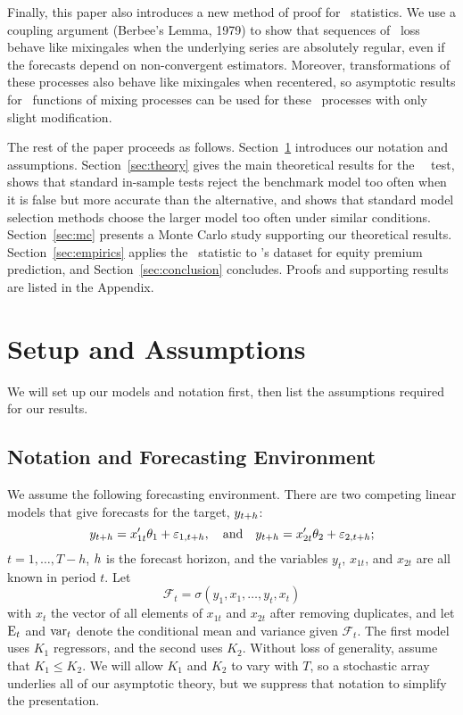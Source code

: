 \documentclass[11pt]{article}
\newcommand{\e}{\varepsilon}
\newcommand{\citepos}[1]{\citeauthor{#1}'s \citeyearpar{#1}}
\begin{document}
Finally, this paper also introduces a new method of proof for \oos\
statistics.  We use a coupling argument (Berbee's Lemma, 1979) to show
that sequences of \oos\ loss behave like mixingales when the
underlying series are absolutely regular, even if the forecasts depend
on non-convergent estimators.  Moreover, transformations of these
processes also behave like mixingales when recentered, so asymptotic
results for \ned\ functions of mixing processes can be used for these
\oos\ processes with only slight modification.

The rest of the paper proceeds as follows.
Section~\ref{sec:assumptions} introduces our notation and assumptions.
Section~\ref{sec:theory} gives the main theoretical results for the
\dmw\ \oos\ test, shows that standard in-sample tests reject the
benchmark model too often when it is false but more accurate than the
alternative, and shows that standard model selection methods choose the
larger model too often under similar conditions. Section~\ref{sec:mc}
presents a Monte Carlo study supporting our theoretical results.
Section~\ref{sec:empirics} applies the \oos\ statistic to
\citepos{GoW:08} dataset for equity premium prediction, and
Section~\ref{sec:conclusion} concludes.  Proofs and supporting results
are listed in the Appendix.

\section{Setup and Assumptions}\label{sec:assumptions}
We will set up our models and notation first, then list the assumptions
required for our results.  

\subsection{Notation and Forecasting Environment}
We assume the following forecasting environment. There are two
competing linear models that give forecasts for the target,
$y_{t+h}$:
\[
y_{t+\h} = x_{1t}'\theta_1 + \e_{1,t+h}, \quad\text{and}\quad
y_{t+\h} = x_{2t}'\theta_2 + \e_{2,t+h};
\]
$t = 1,\dots,T-h$, $h$ is the forecast horizon, and the
variables $y_t$, $x_{1t}$, and $x_{2t}$ are all known in period $t$.
Let
\begin{equation*}
  \mathcal{F}_t = \sigma(y_1, x_1, \dots, y_t, x_t)
\end{equation*}
with $x_t$ the vector of all elements of $x_{1t}$ and $x_{2t}$ after
removing duplicates, and let $\operatorname{E}_t$ and $\operatorname{var}_t$ denote the
conditional mean and variance given $\mathcal{F}_t$.  The first model
uses $K_1$ regressors, and the second uses $K_2$.  Without loss of
generality, assume that $K_1 \leq K_2$.  We will allow $K_1$ and $K_2$
to vary with $T$, so a stochastic array underlies all of our
asymptotic theory, but we suppress that notation to simplify the
presentation.
\end{document}
